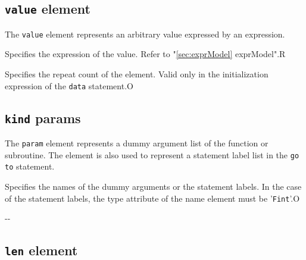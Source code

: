\subsection{ {\tt value} element}

The {\tt value} element represents an arbitrary value expressed by an expression.


\begin{XcodeMLChildElements}
{Specifies the expression of the value.
 Refer to "\ref{sec:exprModel} exprModel".}{R}
\end{XcodeMLChildElements}

\begin{XcodeMLAttributes}
{Specifies the repeat count of the element.
 Valid only in the initialization expression of the {\tt data} statement.}{O}
\end{XcodeMLAttributes}


\subsection{ {\tt kind} params}

The {\tt param} element represents a dummy argument list of the function or subroutine.
The element is also used to represent a statement label list in the {\tt go to} statement.


\begin{XcodeMLChildElements}
{Specifies the names of the dummy arguments or the statement labels.
 In the case of the statement labels, the type attribute of the name element must be '{\tt Fint}'.}{O}
\end{XcodeMLChildElements}

\begin{XcodeMLAttributes}
\XcodeMLAttrDef{-}{-}
{-}{-}
\end{XcodeMLAttributes}


\subsection{ {\tt len} element}

